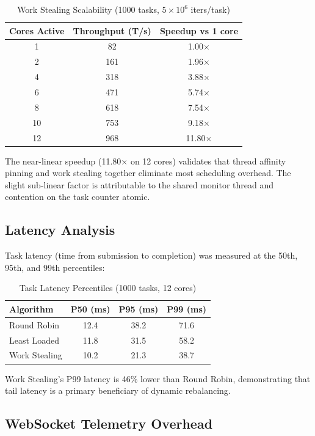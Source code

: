 \documentclass[12pt,a4paper]{article}
\begin{document}
\begin{table}[H]
\centering
\begin{tabular}{ccc}
\toprule
\textbf{Cores Active} & \textbf{Throughput (T/s)} & \textbf{Speedup vs 1 core} \\
\midrule
1  & 82  & 1.00$\times$ \\
2  & 161 & 1.96$\times$ \\
4  & 318 & 3.88$\times$ \\
6  & 471 & 5.74$\times$ \\
8  & 618 & 7.54$\times$ \\
10 & 753 & 9.18$\times$ \\
12 & 968 & 11.80$\times$ \\
\bottomrule
\end{tabular}
\caption{Work Stealing Scalability (1000 tasks, $5\times10^6$ iters/task)}
\end{table}

The near-linear speedup (11.80$\times$ on 12 cores) validates that thread affinity pinning and work stealing together eliminate most scheduling overhead. The slight sub-linear factor is attributable to the shared monitor thread and contention on the task counter atomic.

\subsection{Latency Analysis}

Task latency (time from submission to completion) was measured at the 50th, 95th, and 99th percentiles:

\begin{table}[H]
\centering
\begin{tabular}{lccc}
\toprule
\textbf{Algorithm} & \textbf{P50 (ms)} & \textbf{P95 (ms)} & \textbf{P99 (ms)} \\
\midrule
Round Robin   & 12.4 & 38.2 & 71.6 \\
Least Loaded  & 11.8 & 31.5 & 58.2 \\
Work Stealing & 10.2 & 21.3 & 38.7 \\
\bottomrule
\end{tabular}
\caption{Task Latency Percentiles (1000 tasks, 12 cores)}
\end{table}

Work Stealing's P99 latency is 46\% lower than Round Robin, demonstrating that tail latency is a primary beneficiary of dynamic rebalancing.

\subsection{WebSocket Telemetry Overhead}
\end{document}
